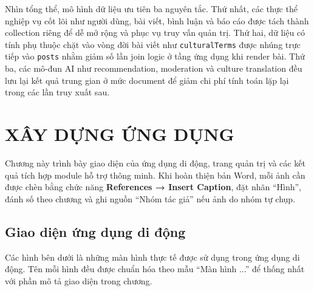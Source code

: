 Nhìn tổng thể, mô hình dữ liệu ưu tiên ba nguyên tắc. Thứ nhất, các thực thể nghiệp vụ cốt lõi như người dùng, bài viết, bình luận và báo cáo được tách thành collection riêng để dễ mở rộng và phục vụ truy vấn quản trị. Thứ hai, dữ liệu có tính phụ thuộc chặt vào vòng đời bài viết như \texttt{culturalTerms} được nhúng trực tiếp vào \texttt{posts} nhằm giảm số lần join logic ở tầng ứng dụng khi render bài. Thứ ba, các mô-đun AI như recommendation, moderation và culture translation đều lưu lại kết quả trung gian ở mức document để giảm chi phí tính toán lặp lại trong các lần truy xuất sau.

\chapter{XÂY DỰNG ỨNG DỤNG}

Chương này trình bày giao diện của ứng dụng di động, trang quản trị và
các kết quả tích hợp module hỗ trợ thông minh. Khi hoàn thiện bản Word,
mỗi ảnh cần được chèn bằng chức năng \textbf{References → Insert Caption},
đặt nhãn ``Hình'', đánh số theo chương và ghi nguồn ``Nhóm tác giả'' nếu
ảnh do nhóm tự chụp.

\section{Giao diện ứng dụng di động}

Các hình bên dưới là những màn hình thực tế được sử dụng trong ứng dụng
di động. Tên mỗi hình đều được chuẩn hóa theo mẫu ``Màn hình ...'' để
thống nhất với phần mô tả giao diện trong chương.

